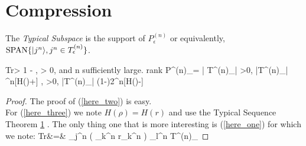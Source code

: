 \documentclass[aps,11pt,twoside,letterpaper]{article}
\def\Tr{\textup{Tr}}
\begin{document}
			
			
			
			
			


\section{Compression}

The \emph{Typical Subspace} is the support of $P^{(n)}_\epsilon$ or equivalently, 
\mbox{$\textup{SPAN} \{ | j^n \rangle, j^n \in T^{(n)}_\epsilon  \}$}.

	\be 
		\Tr{} > 1 - \delta \qquad \forall \delta, \epsilon > 0, 
		\textrm{and } n \textrm{ sufficiently large.}  			
		\label{here_one}
	\ee
	\be
		\textup{rank} P^{(n)}_\epsilon = | T^{(n)}_\epsilon |
		\label{here_two}
	\ee
	\be
		\forall \epsilon >0, \quad |T^{(n)}_\epsilon| ^{n[H(\rho)+\epsilon]} 
		\label{here_three}
	\ee
	\be
		\forall \epsilon, \delta >0, \quad |T^{(n)}_\epsilon| \geq (1-\delta)2^{n[H(\rho)-\epsilon]} 
		\label{here_four}
	\ee


\begin{proof}
The proof of (\ref{here_two}) is easy.\\
For (\ref{here_three}) we note $H(\rho) = H(r)$ and use the Typical Sequence Theorem \ref{} .
The only thing one that is more interesting is (\ref{here_one}) for which we note:
\bea
\Tr{} 	&=&	\sum_{j^n}  \left(
										\sum_{k^n} r_{k^n}\ket{k^n}\bra{k^n}  \right)
										\sum_{l^n \in T^{(n)}_\epsilon} 
\eea


\end{proof}
\end{document}
